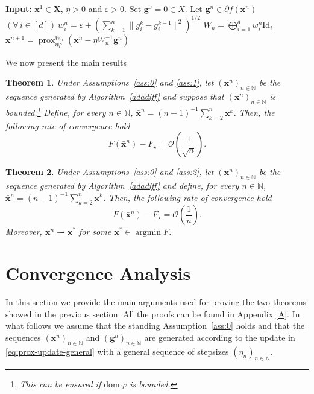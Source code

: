 \documentclass[11pt]{article}
\theoremstyle{plain}
\newtheorem{theorem}{Theorem}[section]
\theoremstyle{definition}
\theoremstyle{remark}
\newcommand{\norm}[1]{\lVert{#1}\rVert}
\DeclareMathOperator*{\argmin}{argmin}
\DeclareMathOperator{\prox}{prox}
\newcommand{\HH}{X}
\newcommand{\bHH}{\bm{X}}
\newcommand{\m}{d}
\newcommand{\bx}{\bm{x}}
\newcommand{\buu}{\bm{g}}
\newcommand{\uu}{g}
\newcommand{\w}{w}
\newcommand{\iter}{n}
\newcommand{\ite}{k}
\newcommand{\N}{\mathbb{N}}
\newcommand{\reg}{\varphi}
\newcommand{\Id}{\mathrm{Id}}
\newcommand{\W}{W}
\begin{document}
\begin{algorithm}[H]
\caption{AdaGrad-Diff}\label{adadiff}
\begin{algorithmic}[1]
\STATE \textbf{Input:} $\bx^1 \in \bHH$, $\eta > 0$ and $\varepsilon > 0$.
\STATE Set $\buu^0 = 0\in \HH$. 
\FOR{$\iter = 1,2, \dots,$}
    \STATE Let $\buu^\iter \in \partial f(\bx^\iter)$
    \STATE $(\forall\, i\in [\m])\ \w^\iter_i = \varepsilon+\left(\sum_{\ite=1}^\iter \norm{\uu_i^\ite - \uu_i^{\ite-1}}^2\right)^{1/2}$  
    \STATE $\W_\iter = \bigoplus_{i=1}^\m \w_i^\iter \Id_i\phantom{\Big(}$
    \STATE $\bx^{\iter+1} = \prox^{\W_\iter}_{\eta\reg} (\bx^\iter - \eta \W_\iter^{-1} \buu^\iter )$
\ENDFOR
\end{algorithmic}
\end{algorithm}
\noindent
We now present the main results
\begin{theorem}\label{thm_nonsmooth}
Under Assumptions~\ref{ass:0} and \ref{ass:1}, let $(\bx^\iter)_{n\in\N}$ be the sequence generated by Algorithm~\ref{adadiff} and suppose that $(\bx^\iter)_{n\in\N}$ is bounded.\footnote{This can be ensured if $\mathrm{dom}\,\reg$ is bounded.} Define, for every $n\in \N$, $\bar{\bx}^\iter = (\iter-1)^{-1}\sum_{\ite=2}^\iter \bx^\ite$. Then, the following rate of convergence hold
    \begin{equation}
        F(\bar{\bx}^\iter) - F_\star = \mathcal{O}\left(\frac{1}{\sqrt{\iter}}\right).
    \end{equation}
\end{theorem}
\begin{theorem}\label{thm_smooth}
Under Assumptions~\ref{ass:0} and \ref{ass:2}, let $(\bx^\iter)_{n\in\N}$ be the sequence generated by Algorithm~\ref{adadiff} and define, for every $n\in \N$, $\bar{\bx}^\iter = (\iter-1)^{-1}\sum_{\ite=2}^\iter \bx^\ite$. Then, the following rate of convergence hold
    \begin{equation}
    \label{eq:rate2}
        F(\bar{\bx}^\iter) - F_\star = \mathcal{O}\left(\frac{1}{\iter}\right).
    \end{equation}
Moreover, $\bx^n \rightharpoonup \bx^*$ for some $\bx^*\in \argmin F$.
\end{theorem}






\section{Convergence Analysis}\label{3}
\label{sec:analysis}
In this section we provide the main arguments used for proving the two theorems showed in the previous section. All the proofs can be found in Appendix \ref{A}. 
In what follows we assume that the standing Assumption~\ref{ass:0} holds and that the sequences
 $(\bx^\iter)_{n\in\N}$ and $(\buu^\iter)_{n\in \N}$ are generated according to the update in \eqref{eq:prox-update-general} with a general sequence of stepsizes $(\eta_\iter)_{\iter\in\N}$.\\
\end{document}

